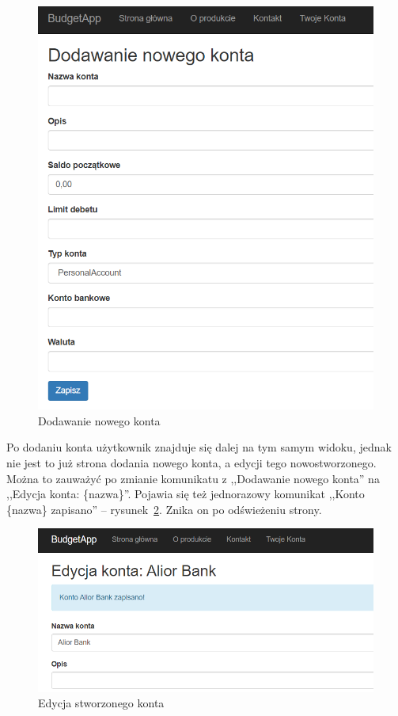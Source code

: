 \begin{figure}[ht]
	\centering
	\includegraphics[scale=.35]{rys04/dodaj-konto.PNG}
	\caption{Dodawanie nowego konta}
	\label{fig:ss-1}
\end{figure}

Po dodaniu konta użytkownik znajduje się dalej na tym samym widoku, jednak nie jest to już strona dodania nowego konta, a edycji tego nowostworzonego. Można to zauważyć po zmianie komunikatu z ,,Dodawanie nowego konta'' na ,,Edycja konta: \{nazwa\}''. Pojawia się też jednorazowy komunikat ,,Konto \{nazwa\} zapisano'' -- rysunek~\ref{fig:ss-2}. Znika on po odświeżeniu strony.

\begin{figure}[ht]
	\centering
	\includegraphics[scale=.35]{rys04/konto-saved.PNG}
	\caption{Edycja stworzonego konta}
	\label{fig:ss-2}
\end{figure}

